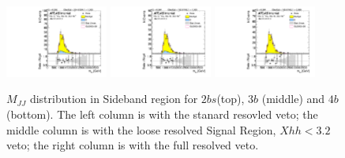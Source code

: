 \begin{figure}[htbp!]
\begin{center}
\includegraphics[width=0.3\textwidth,angle=-90]{figures/boosted/AppendixResveto/Moriond_FourTag_Sideband_mHH_l.pdf}
\includegraphics[width=0.3\textwidth,angle=-90]{figures/boosted/AppendixResveto/Moriond_resveto_FourTag_Sideband_mHH_l.pdf}
\includegraphics[width=0.3\textwidth,angle=-90]{figures/boosted/AppendixResveto/Moriond_fullresveto_FourTag_Sideband_mHH_l.pdf}\\
  \caption{ $M_{JJ}$ distribution in Sideband region for $2bs$(top), $3b$ (middle) and $4b$ (bottom). The left column is with the stanard resovled veto; the middle column is with the loose resolved Signal Region, $Xhh < 3.2$ veto; the right column is with the full resolved veto.}
\label{fig:app-resveto-sb}
\end{center}
\end{figure}

